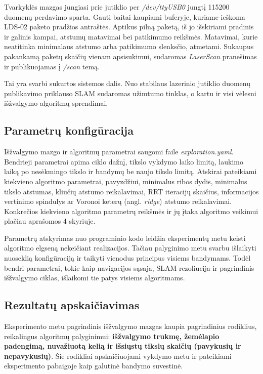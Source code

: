\documentclass[]{VUMIFTemplateClass}
\begin{document}
Tvarkyklės mazgas jungiasi prie jutiklio per \textit{/dev/ttyUSB0} jungtį 115200 duomenų perdavimo sparta. Gauti baitai kaupiami buferyje, kuriame ieškoma LDS-02
paketo pradžios antraštės. Aptikus pilną paketą, iš jo išskiriami pradinis ir galinis kampai, atstumų matavimai bei patikimumo reikšmės. Matavimai, kurie
neatitinka minimalaus atstumo arba patikimumo slenksčio, atmetami. Sukaupus pakankamą paketų skaičių vienam apsisukimui, sudaromas \textit{LaserScan}
pranešimas ir publikuojamas į \textit{/scan} temą.

Tai yra svarbi sukurtos sistemos dalis. Nuo stabilaus lazerinio jutiklio duomenų publikavimo priklauso
SLAM sudaromas užimtumo tinklas, o kartu ir visi vėlesni išžvalgymo algoritmų sprendimai.

\subsection{Parametrų konfigūracija}

Išžvalgymo mazgo ir algoritmų parametrai saugomi faile \textit{exploration.yaml}. Bendrieji parametrai apima ciklo dažnį, tikslo vykdymo laiko limitą, laukimo
laiką po nesėkmingo tikslo ir bandymų be naujo tikslo limitą. Atskirai pateikiami kiekvieno algoritmo parametrai, pavyzdžiui,
minimalus ribos dydis, minimalus tikslo atstumas, kliūčių atstumo reikalavimai, RRT iteracijų skaičius, informacijos vertinimo spindulys ar Voronoi keterų
(angl. \textit{ridge}) atstumo reikalavimai. Konkrečios kiekvieno algoritmo parametrų reikšmės ir jų įtaka algoritmo veikimui plačiau aprašomos 4 skyriuje.

Parametrų atskyrimas nuo programinio kodo leidžia eksperimentų metu keisti algoritmo elgseną nekeičiant realizacijos. Tačiau palyginimo metu svarbu išlaikyti
nuoseklią konfigūraciją ir taikyti vienodus principus visiems bandymams. Todėl bendri parametrai, tokie kaip navigacijos sąsaja, SLAM rezoliucija ir
pagrindinis išžvalgymo ciklas, išlaikomi tie patys visiems algoritmams.

\subsection{Rezultatų apskaičiavimas}

Eksperimento metu pagrindinis išžvalgymo mazgas kaupia pagrindinius rodiklius, reikalingus algoritmų palyginimui: \textbf{išžvalgymo trukmę, žemėlapio padengimą,
nuvažiuotą kelią ir išsiųstų tikslų skaičių (pavykusių ir nepavykusių)}. Šie rodikliai apskaičiuojami vykdymo metu ir pateikiami eksperimento pabaigoje kaip galutinė bandymo suvestinė.
\end{document}
